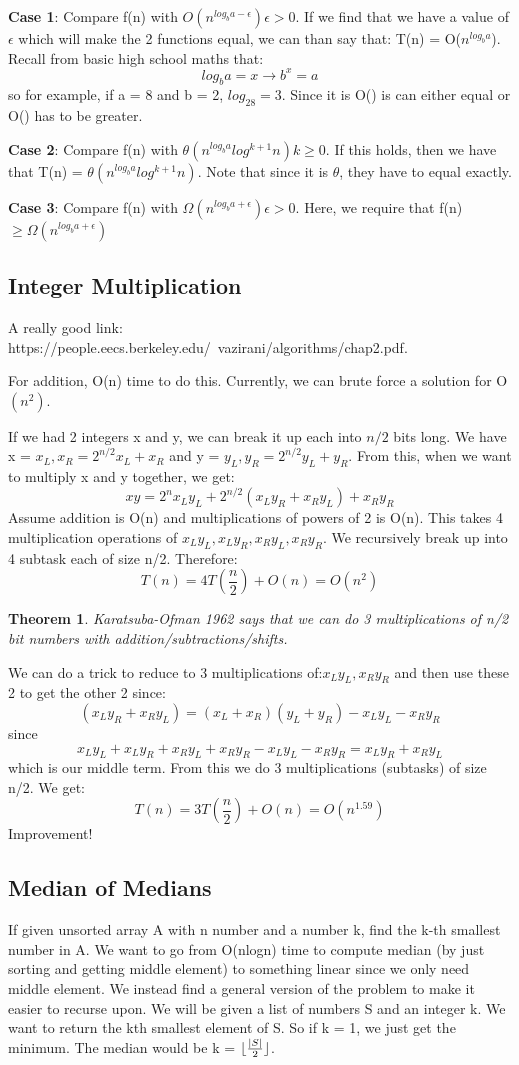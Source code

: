 \documentclass[11pt, oneside]{article}
\newtheorem{theorem}{Theorem}
\theoremstyle{definition}
\DeclarePairedDelimiter\floor{\lfloor}{\rfloor}
\begin{document}
\textbf{Case 1}: Compare f(n) with $O(n^{log_ba - \epsilon}) \epsilon > 0$. If we find that we have a value of $\epsilon$ which will make the 2 functions equal, we can than say that: T(n) = O($n^{log_ba}$). Recall from basic high school maths that:
$$
log_ba = x \rightarrow b^x = a
$$
so for example, if a = 8 and b = 2, $log_28 = 3$. Since it is O() is can either equal or O() has to be greater.

\textbf{Case 2}: Compare f(n) with $\theta(n^{log_ba}log^{k+1}n) k \geq 0$. If this holds, then we have that T(n) = $\theta(n^{log_ba}log^{k+1}n)$. Note that since it is $\theta$, they have to equal exactly.

\textbf{Case 3}: Compare f(n) with $\Omega(n^{log_ba + \epsilon}) \epsilon > 0$. Here, we require that f(n) $\geq \Omega(n^{log_ba + \epsilon})$

\subsection{Integer Multiplication}
A really good link: https://people.eecs.berkeley.edu/~vazirani/algorithms/chap2.pdf.

For addition, O(n) time to do this. Currently, we can brute force a solution for O$(n^2)$.

If we had 2 integers x and y, we can break it up each into $n/2$ bits long. We have x = $x_L,x_R = 2^{n/2}x_L + x_R$ and y = $y_L,y_R = 2^{n/2}y_L + y_R$. From this, when we want to multiply x and y together, we get:
$$
xy = 2^nx_Ly_L + 2^{n/2}(x_Ly_R + x_Ry_L) + x_Ry_R
$$
Assume addition is O(n) and multiplications of powers of 2 is O(n). This takes 4 multiplication operations of $x_Ly_L, x_Ly_R, x_Ry_L, x_Ry_R$. We recursively break up into 4 subtask each of size n/2. Therefore:
$$
T(n) = 4T(\frac{n}{2}) + O(n) = O(n^2)
$$

\begin{theorem}
  Karatsuba-Ofman 1962 says that we can do 3 multiplications of n/2 bit numbers with addition/subtractions/shifts.
\end{theorem}
We can do a trick to reduce to 3 multiplications of:$x_Ly_L, x_Ry_R$ and then use these 2 to get the other 2 since:
$$
(x_Ly_R + x_Ry_L) = (x_L + x_R)(y_L + y_R) - x_Ly_L - x_Ry_R
$$
since
$$
x_Ly_L + x_Ly_R + x_Ry_L + x_Ry_R - x_Ly_L - x_Ry_R = x_Ly_R + x_Ry_L
$$
which is our middle term. From this we do 3 multiplications (subtasks) of size n/2. We get:
$$
T(n) = 3T(\frac{n}{2}) + O(n) = O(n^{1.59})
$$
Improvement!

\subsection{Median of Medians}
If given unsorted array A with n number and a number k, find the k-th smallest number in A. We want to go from O(nlogn) time to compute median (by just sorting and getting middle element) to something linear since we only need middle element. We instead find a general version of the problem to make it easier to recurse upon. We will be given a list of numbers S and an integer k. We want to return the kth smallest element of S. So if k = 1, we just get the minimum. The median would be k = $\floor{\frac{|S|}{2}}$.
\end{document}
